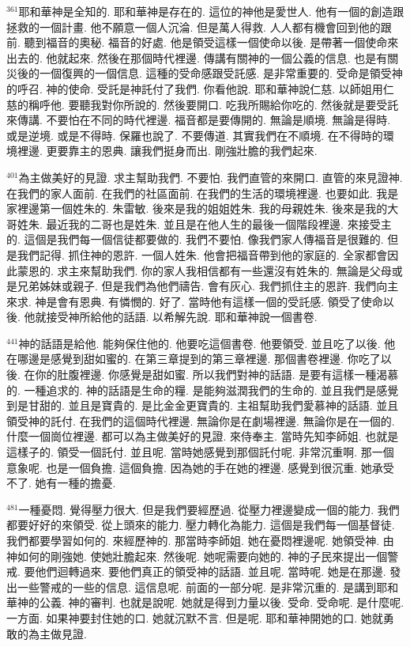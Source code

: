 \documentclass{book}
\begin{document}
$^{361}$耶和華神是全知的.
耶和華神是存在的.
這位的神他是愛世人.
他有一個的創造跟拯救的一個計畫.
他不願意一個人沉淪.
但是萬人得救.
人人都有機會回到他的跟前.
聽到福音的奧秘.
福音的好處.
他是領受這樣一個使命以後.
是帶著一個使命來出去的.
他就起來.
然後在那個時代裡邊.
傳講有關神的一個公義的信息.
也是有關災後的一個復興的一個信息.
這種的受命感跟受託感.
是非常重要的.
受命是領受神的呼召.
神的使命.
受託是神託付了我們.
你看他說.
耶和華神說仁慈.
以師姐用仁慈的稱呼他.
要聽我對你所說的.
然後要開口.
吃我所賜給你吃的.
然後就是要受託來傳講.
不要怕在不同的時代裡邊.
福音都是要傳開的.
無論是順境.
無論是得時.
或是逆境.
或是不得時.
保羅也說了.
不要傳道.
其實我們在不順境.
在不得時的環境裡邊.
更要靠主的恩典.
讓我們挺身而出.
剛強壯膽的我們起來.

$^{401}$為主做美好的見證.
求主幫助我們.
不要怕.
我們直管的來開口.
直管的來見證神.
在我們的家人面前.
在我們的社區面前.
在我們的生活的環境裡邊.
也要如此.
我是家裡邊第一個姓朱的.
朱雷敏.
後來是我的姐姐姓朱.
我的母親姓朱.
後來是我的大哥姓朱.
最近我的二哥也是姓朱.
並且是在他人生的最後一個階段裡邊.
來接受主的.
這個是我們每一個信徒都要做的.
我們不要怕.
像我們家人傳福音是很難的.
但是我們記得.
抓住神的恩許.
一個人姓朱.
他會把福音帶到他的家庭的.
全家都會因此蒙恩的.
求主來幫助我們.
你的家人我相信都有一些還沒有姓朱的.
無論是父母或是兄弟姊妹或親子.
但是我們為他們禱告.
會有灰心.
我們抓住主的恩許.
我們向主來求.
神是會有恩典.
有憐憫的.
好了.
當時他有這樣一個的受託感.
領受了使命以後.
他就接受神所給他的話語.
以希解先說.
耶和華神說一個書卷.

$^{441}$神的話語是給他.
能夠保住他的.
他要吃這個書卷.
他要領受.
並且吃了以後.
他在哪邊是感覺到甜如蜜的.
在第三章提到的第三章裡邊.
那個書卷裡邊.
你吃了以後.
在你的肚腹裡邊.
你感覺是甜如蜜.
所以我們對神的話語.
是要有這樣一種渴慕的.
一種追求的.
神的話語是生命的糧.
是能夠滋潤我們的生命的.
並且我們是感覺到是甘甜的.
並且是寶貴的.
是比金金更寶貴的.
主祖幫助我們愛慕神的話語.
並且領受神的託付.
在我們的這個時代裡邊.
無論你是在劇場裡邊.
無論你是在一個的.
什麼一個崗位裡邊.
都可以為主做美好的見證.
來侍奉主.
當時先知李師姐.
也就是這樣子的.
領受一個託付.
並且呢.
當時她感覺到那個託付呢.
非常沉重啊.
那一個意象呢.
也是一個負擔.
這個負擔.
因為她的手在她的裡邊.
感覺到很沉重.
她承受不了.
她有一種的擔憂.

$^{481}$一種憂悶.
覺得壓力很大.
但是我們要經歷過.
從壓力裡邊變成一個的能力.
我們都要好好的來領受.
從上頭來的能力.
壓力轉化為能力.
這個是我們每一個基督徒.
我們都要學習如何的.
來經歷神的.
那當時李師姐.
她在憂悶裡邊呢.
她領受神.
由神如何的剛強她.
使她壯膽起來.
然後呢.
她呢需要向她的.
神的子民來提出一個警戒.
要他們迴轉過來.
要他們真正的領受神的話語.
並且呢.
當時呢.
她是在那邊.
發出一些警戒的一些的信息.
這信息呢.
前面的一部分呢.
是非常沉重的.
是講到耶和華神的公義.
神的審判.
也就是說呢.
她就是得到力量以後.
受命.
受命呢.
是什麼呢.
一方面.
如果神要封住她的口.
她就沉默不言.
但是呢.
耶和華神開她的口.
她就勇敢的為主做見證.
\end{document}
